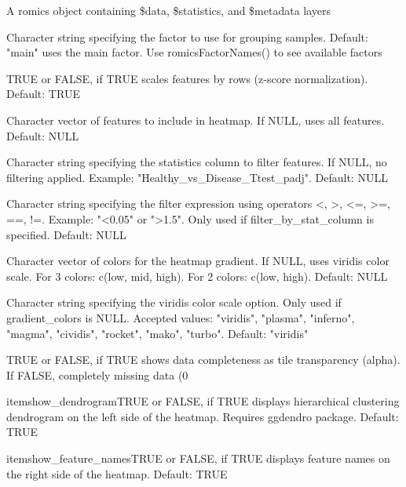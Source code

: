 \documentclass[a4paper]{book}
\begin{document}
\begin{Arguments}
\begin{ldescription}
\item[\code{romics\_object}] A romics object containing \$data, \$statistics, and \$metadata layers

\item[\code{factor}] Character string specifying the factor to use for grouping samples. Default: "main" uses the main factor. Use romicsFactorNames() to see available factors

\item[\code{scale\_feature}] TRUE or FALSE, if TRUE scales features by rows (z-score normalization). Default: TRUE

\item[\code{feature\_list}] Character vector of features to include in heatmap. If NULL, uses all features. Default: NULL

\item[\code{filter\_by\_stat\_column}] Character string specifying the statistics column to filter features. If NULL, no filtering applied. Example: "Healthy\_vs\_Disease\_Ttest\_padj". Default: NULL

\item[\code{stat\_column\_filter}] Character string specifying the filter expression using operators <, >, <=, >=, ==, !=. Example: "<0.05" or ">1.5". Only used if filter\_by\_stat\_column is specified. Default: NULL

\item[\code{gradient\_colors}] Character vector of colors for the heatmap gradient. If NULL, uses viridis color scale. For 3 colors: c(low, mid, high). For 2 colors: c(low, high). Default: NULL

\item[\code{viridis\_option}] Character string specifying the viridis color scale option. Only used if gradient\_colors is NULL. Accepted values: "viridis", "plasma", "inferno", "magma", "cividis", "rocket", "mako", "turbo". Default: "viridis"

\item[\code{show\_completeness}] TRUE or FALSE, if TRUE shows data completeness as tile transparency (alpha). If FALSE, completely missing data (0

\bsl{}itemshow\_dendrogramTRUE or FALSE, if TRUE displays hierarchical clustering dendrogram on the left side of the heatmap. Requires ggdendro package. Default: TRUE

\bsl{}itemshow\_feature\_namesTRUE or FALSE, if TRUE displays feature names on the right side of the heatmap. Default: TRUE


\end{ldescription}
\end{Arguments}
\end{document}

